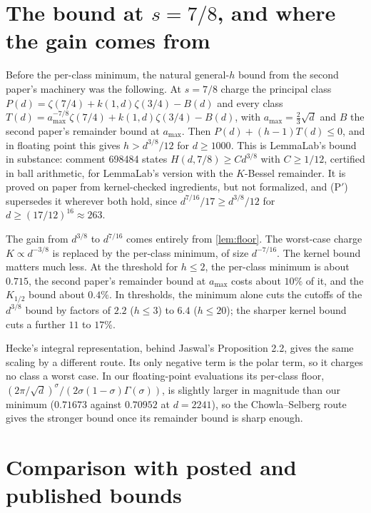 \documentclass[11pt]{article}
\theoremstyle{definition}
\begin{document}
\section{The bound at \texorpdfstring{$s = 7/8$}{s = 7/8}, and where the gain comes from}\label{sec:seveneighths}

Before the per-class minimum, the natural general-$h$ bound from the second paper's machinery was the following. At $s = 7/8$ charge the principal class $P(d) = \zeta(7/4) + k(1,d)\zeta(3/4) - B(d)$ and every class $T(d) = a_{\max}^{-7/8}\zeta(7/4) + k(1,d)\zeta(3/4) - B(d)$, with $a_{\max} = \frac23\sqrt d$ and $B$ the second paper's remainder bound at $a_{\max}$. Then $P(d) + (h-1)T(d) \le 0$, and in floating point this gives $h > d^{3/8}/12$ for $d \ge 1000$. This is LemmaLab's bound in substance: comment 698484 states $H(d, 7/8) \ge Cd^{3/8}$ with $C \ge 1/12$, certified in ball arithmetic, for LemmaLab's version with the $K$-Bessel remainder. It is proved on paper from kernel-checked ingredients, but not formalized, and (P$'$) supersedes it wherever both hold, since $d^{7/16}/17 \ge d^{3/8}/12$ for $d \ge (17/12)^{16} \approx 263$.

The gain from $d^{3/8}$ to $d^{7/16}$ comes entirely from \cref{lem:floor}. The worst-case charge $K \propto d^{-3/8}$ is replaced by the per-class minimum, of size $d^{-7/16}$. The kernel bound matters much less. At the threshold for $h \le 2$, the per-class minimum is about $0.715$, the second paper's remainder bound at $a_{\max}$ costs about $10\%$ of it, and the $K_{1/2}$ bound about $0.4\%$. In thresholds, the minimum alone cuts the cutoffs of the $d^{3/8}$ bound by factors of $2.2$ ($h \le 3$) to $6.4$ ($h \le 20$); the sharper kernel bound cuts a further $11$ to $17\%$.

Hecke's integral representation, behind Jaswal's Proposition 2.2, gives the same scaling by a different route. Its only negative term is the polar term, so it charges no class a worst case. In our floating-point evaluations its per-class floor, $(2\pi/\sqrt d)^\sigma/(2\sigma(1-\sigma)\Gamma(\sigma))$, is slightly larger in magnitude than our minimum ($0.71673$ against $0.70952$ at $d = 2241$), so the Chowla--Selberg route gives the stronger bound once its remainder bound is sharp enough.

\section{Comparison with posted and published bounds}\label{sec:compare}
\end{document}
